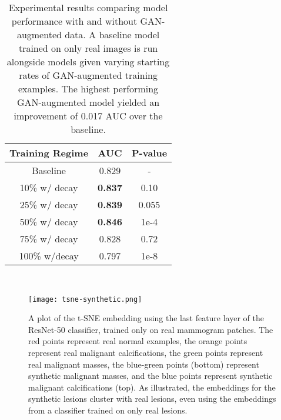 \documentclass{article}
\begin{document}
\renewcommand{\arraystretch}{1.5}
\begin{table}[t]
\centering
\begin{tabular}{| c | c | c |}
\hline
\textbf{\hspace{0.3cm}Training Regime\hspace{0.3cm}} & \textbf{\hspace{0.3cm}AUC\hspace{0.3cm}} & \textbf{\hspace{0.3cm}P-value\hspace{0.3cm}} \\ \hline
Baseline            & 0.829           & -              \\ \hline
10\% w/ decay       & \textbf{0.837}  & 0.10         \\ \hline
25\% w/ decay       & \textbf{0.839}  & 0.055         \\ \hline
50\% w/ decay       & \textbf{0.846}  & 1e-4           \\ \hline
75\% w/ decay       & 0.828           & 0.72          \\ \hline
100\% w/decay      & 0.797          & 1e-8         \\ \hline
\end{tabular}
\\
\caption{Experimental results comparing model performance with and without GAN-augmented data. A baseline model trained on only real images is run alongside models given varying starting rates of GAN-augmented training examples. The highest performing GAN-augmented model yielded an improvement of 0.017 AUC over the baseline.}
\label{table1}
\end{table}

\begin{figure}[t!]
\centering
\texttt{[image: tsne-synthetic.png]}
\caption{A plot of the t-SNE embedding using the last feature layer of the ResNet-50 classifier, trained only on real mammogram patches. The red points represent real normal examples, the orange points represent real malignant calcifications, the green points represent real malignant masses, the blue-green points (bottom) represent synthetic malignant masses, and the blue points represent synthetic malignant calcifications (top). As illustrated, the embeddings for the synthetic lesions cluster with real lesions, even using the embeddings from a classifier trained on only real lesions.} \label{tsne-synthetic}
\end{figure}
\end{document}
